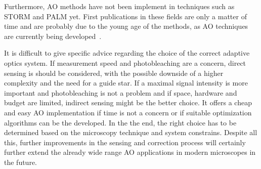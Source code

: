 Furthermore, AO methods have not been implement in techniques such as STORM and PALM yet. First publications in these fields are only a matter of time and are probably due to the young age of the methods, as AO techniques are currently being developed~\cite{future_AOM_PALM_1}. \newline

\noindent It is difficult to give specific advice regarding the choice of the correct adaptive optics system. If measurement speed and photobleaching are a concern, direct sensing is should be considered, with the possible downside of a higher complexity and the need for a guide star. 
If a maximal signal intensity is more important and photobleaching is not a problem and if space, hardware and budget are limited, indirect sensing might be the better choice. It offers a cheap and easy AO implementation if time is not a concern or if suitable optimization algorithms can be the developed. In the the end, the right choice has to be  determined based on the microscopy technique and system constrains. Despite all this, further improvements in the sensing and correction process will certainly further extend the already wide range AO applications in modern microscopes in the future. 